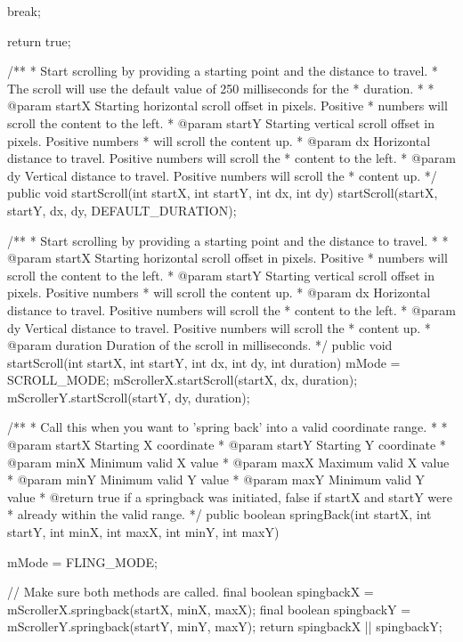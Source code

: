 {{{                break;
        }

        return true;
    }

    /**
     * Start scrolling by providing a starting point and the distance to travel.
     * The scroll will use the default value of 250 milliseconds for the
     * duration.
     *
     * @param startX Starting horizontal scroll offset in pixels. Positive
     *        numbers will scroll the content to the left.
     * @param startY Starting vertical scroll offset in pixels. Positive numbers
     *        will scroll the content up.
     * @param dx Horizontal distance to travel. Positive numbers will scroll the
     *        content to the left.
     * @param dy Vertical distance to travel. Positive numbers will scroll the
     *        content up.
     */
    public void startScroll(int startX, int startY, int dx, int dy) {
        startScroll(startX, startY, dx, dy, DEFAULT_DURATION);
    }

    /**
     * Start scrolling by providing a starting point and the distance to travel.
     *
     * @param startX Starting horizontal scroll offset in pixels. Positive
     *        numbers will scroll the content to the left.
     * @param startY Starting vertical scroll offset in pixels. Positive numbers
     *        will scroll the content up.
     * @param dx Horizontal distance to travel. Positive numbers will scroll the
     *        content to the left.
     * @param dy Vertical distance to travel. Positive numbers will scroll the
     *        content up.
     * @param duration Duration of the scroll in milliseconds.
     */
    public void startScroll(int startX, int startY, int dx, int dy, int duration) {
        mMode = SCROLL_MODE;
        mScrollerX.startScroll(startX, dx, duration);
        mScrollerY.startScroll(startY, dy, duration);
    }

    /**
     * Call this when you want to 'spring back' into a valid coordinate range.
     *
     * @param startX Starting X coordinate
     * @param startY Starting Y coordinate
     * @param minX Minimum valid X value
     * @param maxX Maximum valid X value
     * @param minY Minimum valid Y value
     * @param maxY Minimum valid Y value
     * @return true if a springback was initiated, false if startX and startY were
     *          already within the valid range.
     */
    public boolean springBack(int startX, int startY, int minX, int maxX, int minY, int maxY) {
        mMode = FLING_MODE;

        // Make sure both methods are called.
        final boolean spingbackX = mScrollerX.springback(startX, minX, maxX);
        final boolean spingbackY = mScrollerY.springback(startY, minY, maxY);
        return spingbackX || spingbackY;
    }

}
